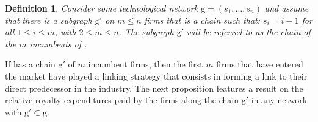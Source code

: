 \documentclass{article}
\newtheorem{definition}{Definition}
\begin{document}
\begin{definition}
Consider some technological network $\text{g}=(s_1,\ldots, s_n)$ and assume that there is a subgraph $\text{g}'$ on $m\leq n$ firms that is a chain such that: $s_i=i-1$ for all $1\leq i \leq m$, with $2\leq m\leq n$. The subgraph $\text{g}'$ will be referred to as the chain of the $m$ incumbents of .
\end{definition}

If  has a chain $\text{g}'$ of $m$ incumbent firms, then the first $m$ firms that have entered the market have played a linking strategy that consists in forming a link to their direct predecessor in the industry. The next proposition features a result on the relative royalty expenditures paid by the firms along the chain $\text{g}'$ in any network  with $\text{g}'\subset \text{g}$.\\
\end{document}
